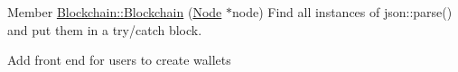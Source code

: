 
\begin{DoxyRefList}
\item[Member \mbox{\hyperlink{class_blockchain_a8b2d507929548019ed2c73b1956317b1}{Blockchain\+::Blockchain}} (\mbox{\hyperlink{class_node}{Node}} $\ast$node)]\label{todo__todo000001}%
%
Find all instances of json\+::parse() and put them in a try/catch block. 



Add front end for users to create wallets 
\end{DoxyRefList}